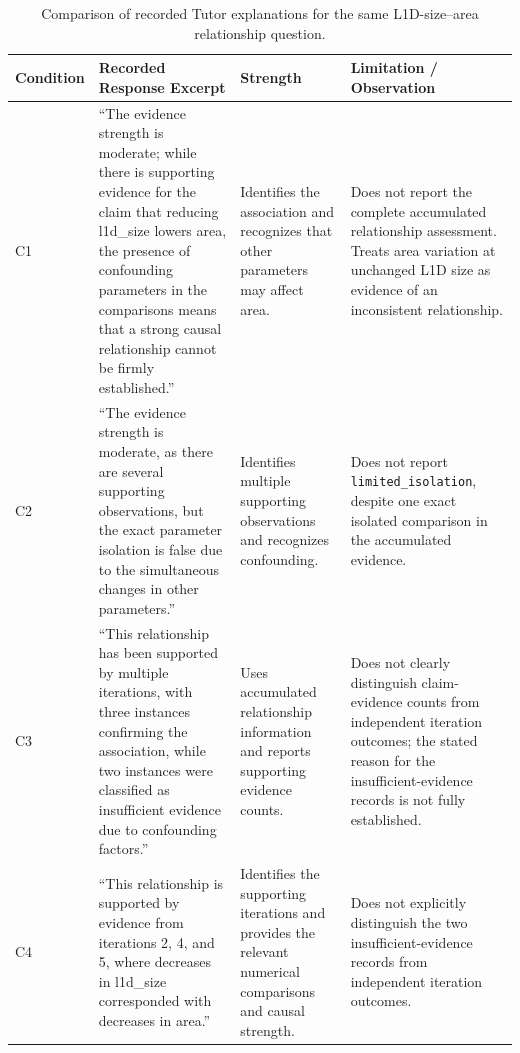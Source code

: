 \begin{table}[t]
\centering
\caption{Comparison of recorded Tutor
explanations for the same
L1D-size--area relationship question.}
\label{tab:app_p5_response_comparison}

\renewcommand{\arraystretch}{1.3}
\footnotesize
\setlength{\tabcolsep}{4pt}

\begin{tabular}{
p{}
p{}
p{}
p{}
}
\toprule
\textbf{Condition} &
\textbf{Recorded Response Excerpt} &
\textbf{Strength} &
\textbf{Limitation / Observation} \\
\midrule

C1 &
``The evidence strength is moderate;
while there is supporting evidence
for the claim that reducing
l1d\_size lowers area, the presence
of confounding parameters in the
comparisons means that a strong
causal relationship cannot be
firmly established.'' &
Identifies the association and
recognizes that other parameters
may affect area. &
Does not report the complete
accumulated relationship assessment.
Treats area variation at unchanged
L1D size as evidence of an
inconsistent relationship. \\

\addlinespace[5pt]

C2 &
``The evidence strength is moderate,
as there are several supporting
observations, but the exact
parameter isolation is false due
to the simultaneous changes in
other parameters.'' &
Identifies multiple supporting
observations and recognizes
confounding. &
Does not report
\texttt{limited\_isolation},
despite one exact isolated
comparison in the accumulated
evidence. \\

\addlinespace[5pt]

C3 &
``This relationship has been
supported by multiple iterations,
with three instances confirming
the association, while two
instances were classified as
insufficient evidence due to
confounding factors.'' &
Uses accumulated relationship
information and reports
supporting evidence counts. &
Does not clearly distinguish
claim-evidence counts from
independent iteration outcomes;
the stated reason for the
insufficient-evidence records
is not fully established. \\

\addlinespace[5pt]

C4 &
``This relationship is supported
by evidence from iterations 2,
4, and 5, where decreases in
l1d\_size corresponded with
decreases in area.'' &
Identifies the supporting
iterations and provides
the relevant numerical
comparisons and causal strength. &
Does not explicitly distinguish
the two insufficient-evidence
records from independent
iteration outcomes. \\

\bottomrule
\end{tabular}
\end{table}

